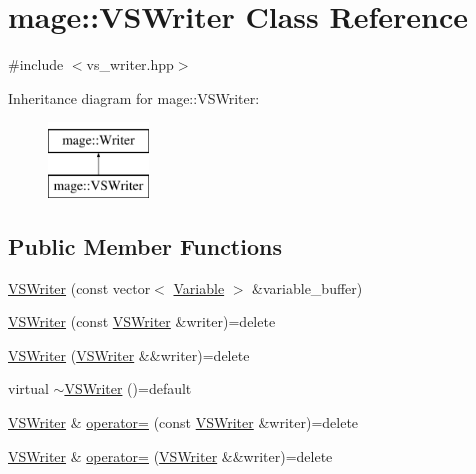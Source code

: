 \hypertarget{classmage_1_1_v_s_writer}{}\section{mage\+:\+:V\+S\+Writer Class Reference}
\label{classmage_1_1_v_s_writer}


{\ttfamily \#include $<$vs\+\_\+writer.\+hpp$>$}

Inheritance diagram for mage\+:\+:V\+S\+Writer\+:\begin{figure}[H]
\begin{center}
\leavevmode
\includegraphics[height=2.000000cm]{classmage_1_1_v_s_writer}
\end{center}
\end{figure}
\subsection*{Public Member Functions}
\begin{DoxyCompactItemize}
\item 
\hyperlink{classmage_1_1_v_s_writer_ac1a9ff905a94e9c89a7ed48dc7c4b629}{V\+S\+Writer} (const vector$<$ \hyperlink{structmage_1_1_variable}{Variable} $>$ \&variable\+\_\+buffer)
\item 
\hyperlink{classmage_1_1_v_s_writer_a77d146f812d9d37ee99c31133d3597b8}{V\+S\+Writer} (const \hyperlink{classmage_1_1_v_s_writer}{V\+S\+Writer} \&writer)=delete
\item 
\hyperlink{classmage_1_1_v_s_writer_a0e35e2cfa8142ba4176c6259d26ce1b1}{V\+S\+Writer} (\hyperlink{classmage_1_1_v_s_writer}{V\+S\+Writer} \&\&writer)=delete
\item 
virtual \hyperlink{classmage_1_1_v_s_writer_ac2268dde1a58f0d1d657e584e33e82fe}{$\sim$\+V\+S\+Writer} ()=default
\item 
\hyperlink{classmage_1_1_v_s_writer}{V\+S\+Writer} \& \hyperlink{classmage_1_1_v_s_writer_af943d317ae357723a08b2bbf2bab23ba}{operator=} (const \hyperlink{classmage_1_1_v_s_writer}{V\+S\+Writer} \&writer)=delete
\item 
\hyperlink{classmage_1_1_v_s_writer}{V\+S\+Writer} \& \hyperlink{classmage_1_1_v_s_writer_af1dca5c791cfb62967cd2437f7db170a}{operator=} (\hyperlink{classmage_1_1_v_s_writer}{V\+S\+Writer} \&\&writer)=delete
\end{DoxyCompactItemize}
